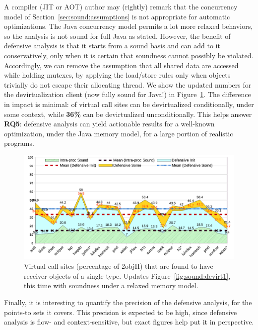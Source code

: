 A compiler (JIT or AOT) author may (rightly) remark that the concurrency model of Section~\ref{sec:sound:assumptions} is not appropriate for automatic optimizations. The Java concurrency model permits a lot more relaxed behaviors, so the analysis is not sound for full Java as stated. However, the benefit of defensive analysis is that it starts from a sound basis and can add to it conservatively, only when it is certain that soundness cannot possibly be violated. Accordingly, we can remove the assumption that all shared data are accessed while holding mutexes, by applying the load/store rules only when objects trivially do not escape their allocating thread. We show the updated numbers for the devirtualization client (now fully sound for Java!) in Figure~\ref{fig:sound:devirt2}. The difference in impact is minimal:  of virtual call sites can be devirtualized conditionally, under some context, while \textbf{36\%} can be devirtualized unconditionally. This helps answer \textbf{RQ5}: defensive analysis can yield actionable results for a well-known optimization, under the Java memory model, for a large portion of realistic programs.

\begin{figure}[tbh]
\centering
\includegraphics[width=\linewidth]{assets/defensive/devirt2.pdf}
\caption{Virtual call sites (percentage of 2objH) that are found to have receiver objects of a single type. Updates Figure~\ref{fig:sound:devirt1}, this time with soundness under a relaxed memory model.}
\label{fig:sound:devirt2}
\end{figure}


Finally, it is interesting to quantify the precision of the defensive analysis, for the points-to sets it covers. This precision is expected to be high, since defensive analysis is flow- and context-sensitive, but exact figures help put it in perspective.

